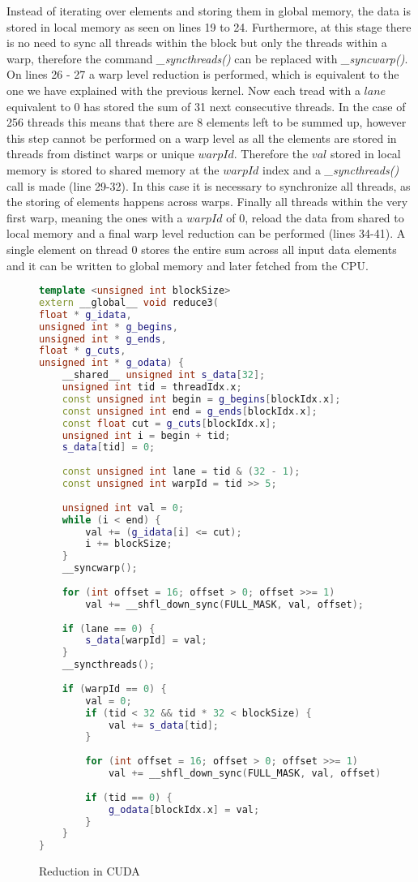 \documentclass[]{article}
\begin{document}
Instead of iterating over elements and storing them in global memory, the data is stored in local memory as seen on lines 19 to 24. Furthermore, at this stage there is no need to sync all threads within the block but only the threads within a warp, therefore the command \textit{\_syncthreads()} can be replaced with \textit{\_syncwarp()}.
On lines 26 - 27 a warp level reduction is performed, which is equivalent to the one we have explained with the previous kernel. Now each tread with a $lane$ equivalent to 0 has stored the sum of 31 next consecutive threads. In the case of 256 threads this means that there are 8 elements left to be summed up, however this step cannot be performed on a warp level as all the elements are stored in threads from distinct warps or unique $warpId$. Therefore the $val$ stored in local memory is stored to shared memory at the $warpId$ index and a \textit{\_syncthreads()} call is made (line 29-32). In this case it is necessary to synchronize all threads, as the storing of elements happens across warps.
Finally all threads within the very first warp, meaning the ones with a $warpId$ of 0, reload the data from shared to local memory and a final warp level reduction can be performed (lines 34-41). A single element on thread 0 stores the entire sum across all input data elements and it can be written to global memory and later fetched from the CPU.

\begin{figure}[H]
	\begin{lstlisting}[language=c++, caption=Kernel Optimized GPU Count Left,
		label = ctlocudawrp]
template <unsigned int blockSize>
extern __global__ void reduce3(
float * g_idata,
unsigned int * g_begins,
unsigned int * g_ends,
float * g_cuts,
unsigned int * g_odata) {
	__shared__ unsigned int s_data[32];
	unsigned int tid = threadIdx.x;
	const unsigned int begin = g_begins[blockIdx.x];
	const unsigned int end = g_ends[blockIdx.x];
	const float cut = g_cuts[blockIdx.x];
	unsigned int i = begin + tid;
	s_data[tid] = 0;
	
	const unsigned int lane = tid & (32 - 1);
	const unsigned int warpId = tid >> 5;
	
	unsigned int val = 0;
	while (i < end) {
		val += (g_idata[i] <= cut);
		i += blockSize;
	}
	__syncwarp();
	
	for (int offset = 16; offset > 0; offset >>= 1)
		val += __shfl_down_sync(FULL_MASK, val, offset);
	
	if (lane == 0) {
		s_data[warpId] = val;
	}
	__syncthreads();
	
	if (warpId == 0) {
		val = 0;
		if (tid < 32 && tid * 32 < blockSize) {
			val += s_data[tid];
		}
		
		for (int offset = 16; offset > 0; offset >>= 1)
			val += __shfl_down_sync(FULL_MASK, val, offset);
		
		if (tid == 0) {
			g_odata[blockIdx.x] = val;
		}
	}
}
	\end{lstlisting}
	\caption{Reduction in CUDA}
	\label{cuda:reduction3}
\end{figure}
\end{document}
